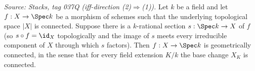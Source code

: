 
\begin{lemma}

  \label{lem:geometricallyConnected_of_connected_of_section}
  \textit{Source: Stacks, tag 037Q (iff-direction (2)\(\Rightarrow\)(1)).}
  Let \(k\) be a field and let \(f : X \to \Spec k\) be a morphism of
  schemes such that the underlying topological space \(|X|\) is
  connected. Suppose there is a \(k\)-rational section \(s : \Spec k \to X\)
  of \(f\) (so \(s \circ f = \id_X\) topologically and the image of \(s\)
  meets every irreducible component of \(X\) through which \(s\) factors).
  Then \(f : X \to \Spec k\) is geometrically connected, in the sense
  that for every field extension \(K/k\) the base change \(X_K\) is
  connected.
\end{lemma}

